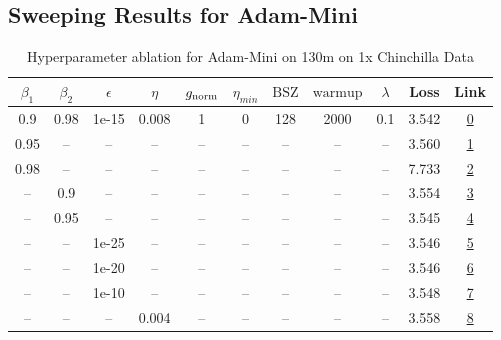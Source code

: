 \subsection{Sweeping Results for Adam-Mini}%
\begin{table}[H]
\centering
\caption{Hyperparameter ablation for Adam-Mini on 130m on 1x Chinchilla Data}
\label{tab:ablation_adam-mini_130m_on_1x_chinchilla_data}
\begin{tabular}{ccccccccccc}
\toprule
$\beta_1$ & $\beta_2$ & $\epsilon$ & $\eta$ & $g_{\mathrm{norm}}$ & $\eta_{min}$ & $\mathrm{BSZ}$ & $\mathrm{warmup}$ & $\lambda$ & Loss & Link \\
\midrule
0.9 & 0.98 & 1e-15 & 0.008 & 1 & 0 & 128 & 2000 & 0.1 & 3.542 & \href{https://wandb.ai/marin-community/optimizer-scaling/runs/sweep-130m-2B-minif4e66flr0.008-wd0.1-minlr0-warmup2000-b10.9-b2-4d3c05}{0} \\
\midrule
0.95 & -- & -- & -- & -- & -- & -- & -- & -- & 3.560 & \href{https://wandb.ai/marin-community/optimizer-scaling/runs/sweep-130m-2B-minia4c40alr0.008-wd0.1-minlr0-warmup2000-b10.95-b-73290f}{1} \\
0.98 & -- & -- & -- & -- & -- & -- & -- & -- & 7.733 & \href{https://wandb.ai/marin-community/optimizer-scaling/runs/sweep-130m-2B-mini59cf9alr0.008-wd0.1-minlr0-warmup2000-b10.98-b-df073b}{2} \\
-- & 0.9 & -- & -- & -- & -- & -- & -- & -- & 3.554 & \href{https://wandb.ai/marin-community/optimizer-scaling/runs/sweep-130m-2B-mini84080dlr0.008-wd0.1-minlr0-warmup2000-b10.9-b2-d74517}{3} \\
-- & 0.95 & -- & -- & -- & -- & -- & -- & -- & 3.545 & \href{https://wandb.ai/marin-community/optimizer-scaling/runs/sweep-130m-2B-minic9835clr0.008-wd0.1-minlr0-warmup2000-b10.9-b2-d57aa7}{4} \\
-- & -- & 1e-25 & -- & -- & -- & -- & -- & -- & 3.546 & \href{https://wandb.ai/marin-community/optimizer-scaling/runs/sweep-130m-2B-mini510347lr0.008-wd0.1-minlr0-warmup2000-b10.9-b2-9a27cf}{5} \\
-- & -- & 1e-20 & -- & -- & -- & -- & -- & -- & 3.546 & \href{https://wandb.ai/marin-community/optimizer-scaling/runs/sweep-130m-2B-mini6d8617lr0.008-wd0.1-minlr0-warmup2000-b10.9-b2-7a2d5e}{6} \\
-- & -- & 1e-10 & -- & -- & -- & -- & -- & -- & 3.548 & \href{https://wandb.ai/marin-community/optimizer-scaling/runs/sweep-130m-2B-mini845331lr0.008-wd0.1-minlr0-warmup2000-b10.9-b2-fadab9}{7} \\
-- & -- & -- & 0.004 & -- & -- & -- & -- & -- & 3.558 & \href{https://wandb.ai/marin-community/optimizer-scaling/runs/sweep-130m-2B-mini08c39flr0.004-wd0.1-minlr0-warmup2000-b10.9-b2-1b064a}{8} \\

\end{tabular}
\end{table}
